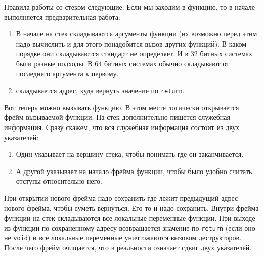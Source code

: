 \documentclass{article}
\begin{document}
Правила работы со стеком следующие.
Если мы заходим в функцию, то в начале выполняется предварительная работа:
\begin{enumerate}
\item В начале на стек складываются аргументы функции (их возможно перед этим надо вычислить и для этого понадобится вызов других функций).
В каком порядке они складываются стандарт не определяет.
И в $32$ битных системах были разные подходы.
В $64$ битных системах обычно складывают от последнего аргумента к первому.

\item складывается адрес, куда вернуть значение по \verb"return".
\end{enumerate}
Вот теперь можно вызывать функцию.
В этом месте логически открывается фрейм вызываемой функции.
На стек дополнительно пишется служебная информация.
Сразу скажем, что вся служебная информация состоит из двух указателей:
\begin{enumerate}
\item Один указывает на вершину стека, чтобы понимать где он заканчивается.

\item А другой указывает на начало фрейма функции, чтобы было удобно считать отступы относительно него.
\end{enumerate}
При открытии нового фрейма надо сохранить где лежит предыдущий адрес нового фрейма, чтобы суметь вернуться.
Его то и надо сохранить.
Внутри фрейма функции на стек складываются все локальные переменные функции.
При выходе из функции по сохраненному адресу возвращается значение по \verb"return" (если оно не \verb"void") и все локальные переменные уничтожаются вызовом деструкторов.
После чего фрейм очищается, что в реальности означает сдвиг двух указателей.
\end{document}
